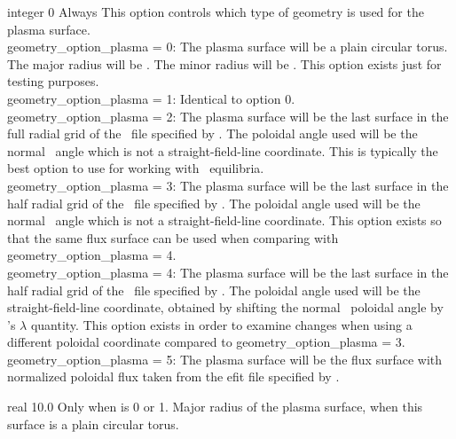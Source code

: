 {integer}
{0}
{Always}
{This option controls which type of geometry is used for the plasma surface.\\

{\ttfamily geometry\_option\_plasma} = 0: The plasma surface will be a plain circular torus. The major radius will be .
     The minor radius will be . This option exists just for testing purposes.\\

{\ttfamily geometry\_option\_plasma} = 1: Identical to option 0.\\

{\ttfamily geometry\_option\_plasma} = 2: The plasma surface will be the last surface in the full radial grid of the \vmec~file specified by .
The poloidal angle used will be the normal \vmec~angle which is not a straight-field-line coordinate.
This is typically the best option to use for working with \vmec~equilibria.\\

{\ttfamily geometry\_option\_plasma} = 3: The plasma surface will be the last surface in the half radial grid of the \vmec~file specified by .
The poloidal angle used will be the normal \vmec~angle which is not a straight-field-line coordinate.
This option exists so that the same flux surface can be used when comparing with {\ttfamily geometry\_option\_plasma} = 4.\\

{\ttfamily geometry\_option\_plasma} = 4: The plasma surface will be the last surface in the half radial grid of the \vmec~file specified by .
The poloidal angle used will be the straight-field-line coordinate, obtained by shifting the normal \vmec~poloidal angle by \vmec's $\lambda$ quantity.
This option exists in order to examine changes when using a different poloidal coordinate compared to {\ttfamily geometry\_option\_plasma} = 3.\\

{\ttfamily geometry\_option\_plasma} = 5: The plasma surface will be the flux surface with normalized poloidal flux
 taken from the {\ttfamily efit} file specified by .
}

\myhrule

{real}
{10.0}
{Only when  is 0 or 1.}
{Major radius of the plasma surface, when this surface is a plain circular torus.}

